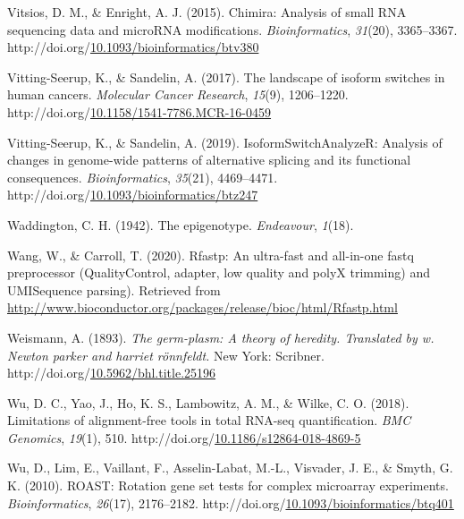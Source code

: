 \documentclass[12pt,twoside]{reedthesis}
\newlength{\cslhangindent}
\newenvironment{CSLReferences}[2] %
 {%
  \setlength{\parindent}{0pt}
  \ifodd #1 \everypar{\setlength{\hangindent}{\cslhangindent}}\ignorespaces\fi
  \ifnum #2 > 0
  \setlength{\parskip}{#2\baselineskip}
  \fi
 }%
 {}
\begin{document}
\begin{CSLReferences}{1}{0}
\leavevmode{}%
Vitsios, D. M., \& Enright, A. J. (2015). Chimira: Analysis of small RNA sequencing data and microRNA modifications. \emph{Bioinformatics}, \emph{31}(20), 3365--3367. http://doi.org/\href{https://doi.org/10.1093/bioinformatics/btv380}{10.1093/bioinformatics/btv380}

\leavevmode{}%
Vitting-Seerup, K., \& Sandelin, A. (2017). The landscape of isoform switches in human cancers. \emph{Molecular Cancer Research}, \emph{15}(9), 1206--1220. http://doi.org/\href{https://doi.org/10.1158/1541-7786.MCR-16-0459}{10.1158/1541-7786.MCR-16-0459}

\leavevmode{}%
Vitting-Seerup, K., \& Sandelin, A. (2019). IsoformSwitchAnalyzeR: Analysis of changes in genome-wide patterns of alternative splicing and its functional consequences. \emph{Bioinformatics}, \emph{35}(21), 4469--4471. http://doi.org/\href{https://doi.org/10.1093/bioinformatics/btz247}{10.1093/bioinformatics/btz247}

\leavevmode{}%
Waddington, C. H. (1942). The epigenotype. \emph{Endeavour}, \emph{1}(18).

\leavevmode{}%
Wang, W., \& Carroll, T. (2020). Rfastp: An ultra-fast and all-in-one fastq preprocessor (QualityControl, adapter, low quality and polyX trimming) and UMISequence parsing). Retrieved from \url{http://www.bioconductor.org/packages/release/bioc/html/Rfastp.html}

\leavevmode{}%
Weismann, A. (1893). \emph{The germ-plasm: A theory of heredity. Translated by w. Newton parker and harriet rönnfeldt.} New York: Scribner. http://doi.org/\href{https://doi.org/10.5962/bhl.title.25196}{10.5962/bhl.title.25196}

\leavevmode{}%
Wu, D. C., Yao, J., Ho, K. S., Lambowitz, A. M., \& Wilke, C. O. (2018). Limitations of alignment-free tools in total RNA-seq quantification. \emph{BMC Genomics}, \emph{19}(1), 510. http://doi.org/\href{https://doi.org/10.1186/s12864-018-4869-5}{10.1186/s12864-018-4869-5}

\leavevmode{}%
Wu, D., Lim, E., Vaillant, F., Asselin-Labat, M.-L., Visvader, J. E., \& Smyth, G. K. (2010). ROAST: Rotation gene set tests for complex microarray experiments. \emph{Bioinformatics}, \emph{26}(17), 2176--2182. http://doi.org/\href{https://doi.org/10.1093/bioinformatics/btq401}{10.1093/bioinformatics/btq401}


\end{CSLReferences}
\end{document}
